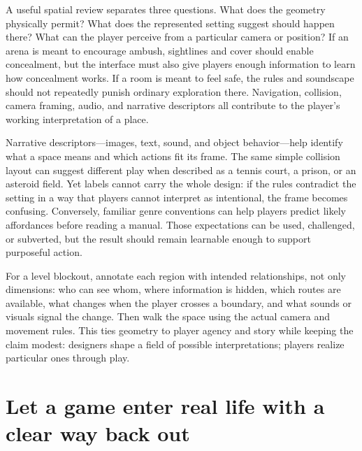 A useful spatial review separates three questions. What does the geometry physically permit? What does the represented setting suggest should happen there? What can the player perceive from a particular camera or position? If an arena is meant to encourage ambush, sightlines and cover should enable concealment, but the interface must also give players enough information to learn how concealment works. If a room is meant to feel safe, the rules and soundscape should not repeatedly punish ordinary exploration there. Navigation, collision, camera framing, audio, and narrative descriptors all contribute to the player's working interpretation of a place.

Narrative descriptors---images, text, sound, and object behavior---help identify what a space means and which actions fit its frame. The same simple collision layout can suggest different play when described as a tennis court, a prison, or an asteroid field. Yet labels cannot carry the whole design: if the rules contradict the setting in a way that players cannot interpret as intentional, the frame becomes confusing. Conversely, familiar genre conventions can help players predict likely affordances before reading a manual. Those expectations can be used, challenged, or subverted, but the result should remain learnable enough to support purposeful action.

For a level blockout, annotate each region with intended relationships, not only dimensions: who can see whom, where information is hidden, which routes are available, what changes when the player crosses a boundary, and what sounds or visuals signal the change. Then walk the space using the actual camera and movement rules. This ties geometry to player agency and story while keeping the claim modest: designers shape a field of possible interpretations; players realize particular ones through play.

\section{Let a game enter real life with a clear way back out}\label{06-engine-ii-ch047-let-a-game-enter-real-life-with-a-clear-way-back-out}

\hypertarget{06-engine-ii-ch047-let-a-game-enter-real-life-with-a-clear-way-back-out}{}

